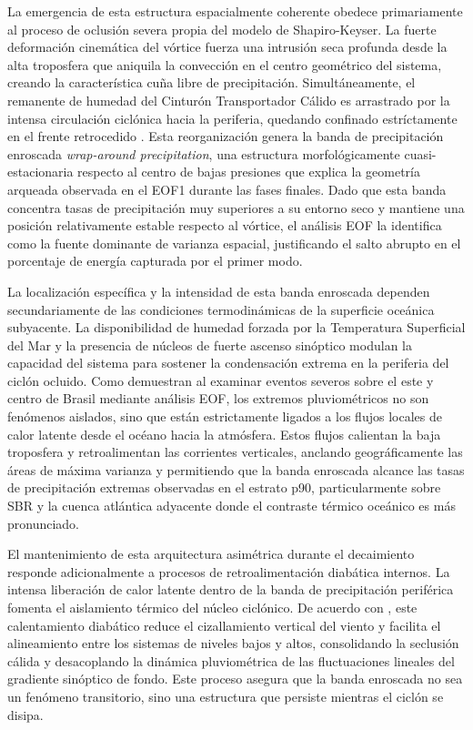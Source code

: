 La emergencia de esta estructura espacialmente coherente obedece primariamente al proceso de oclusión severa propia del modelo de Shapiro-Keyser. 
La fuerte deformación cinemática del vórtice fuerza una intrusión seca profunda desde la alta troposfera que aniquila la convección en el centro geométrico del sistema, creando la característica cuña libre de precipitación. 
Simultáneamente, el remanente de humedad del Cinturón Transportador Cálido es arrastrado por la intensa circulación ciclónica hacia la periferia, quedando confinado estríctamente en el frente retrocedido \citep{shapiro1990life, schultz2021antecedents}. 
Esta reorganización genera la banda de precipitación enroscada \textit{wrap-around precipitation}, una estructura morfológicamente cuasi-estacionaria respecto al centro de bajas presiones que explica la geometría arqueada observada en el EOF1 durante las fases finales. 
Dado que esta banda concentra tasas de precipitación muy superiores a su entorno seco y mantiene una posición relativamente estable respecto al vórtice, el análisis EOF la identifica como la fuente dominante de varianza espacial, justificando el salto abrupto en el porcentaje de energía capturada por el primer modo.

La localización específica y la intensidad de esta banda enroscada dependen secundariamente de las condiciones termodinámicas de la superficie oceánica subyacente. 
La disponibilidad de humedad forzada por la Temperatura Superficial del Mar y la presencia de núcleos de fuerte ascenso sinóptico modulan la capacidad del sistema para sostener la condensación extrema en la periferia del ciclón ocluido. 
Como demuestran \citet{laureanti2024relation} al examinar eventos severos sobre el este y centro de Brasil mediante análisis EOF, los extremos pluviométricos no son fenómenos aislados, sino que están estrictamente ligados a los flujos locales de calor latente desde el océano hacia la atmósfera. 
Estos flujos calientan la baja troposfera y retroalimentan las corrientes verticales, anclando geográficamente las áreas de máxima varianza y permitiendo que la banda enroscada alcance las tasas de precipitación extremas observadas en el estrato p90, particularmente sobre SBR y la cuenca atlántica adyacente donde el contraste térmico oceánico es más pronunciado.

El mantenimiento de esta arquitectura asimétrica durante el decaimiento responde adicionalmente a procesos de retroalimentación diabática internos. 
La intensa liberación de calor latente dentro de la banda de precipitación periférica fomenta el aislamiento térmico del núcleo ciclónico. 
De acuerdo con \citet{reboita2022from}, este calentamiento diabático reduce el cizallamiento vertical del viento y facilita el alineamiento entre los sistemas de niveles bajos y altos, consolidando la seclusión cálida y desacoplando la dinámica pluviométrica de las fluctuaciones lineales del gradiente sinóptico de fondo. 
Este proceso asegura que la banda enroscada no sea un fenómeno transitorio, sino una estructura que persiste mientras el ciclón se disipa.

